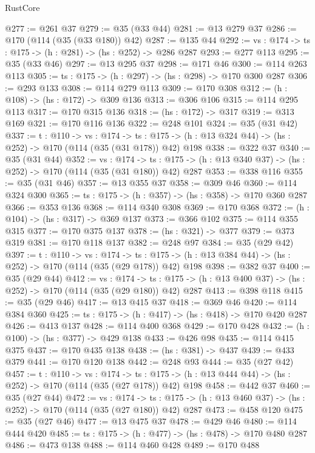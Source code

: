 \begin{lexlean}{RustCore}
\begin{coremodule}
@277 := @261 @37
@279 := @35 (@33 @44)
@281 := @13 @279 @37
@286 := @170 (@114 (@35 (@33 @180)) @42)
@287 := @135 @44
@292 := {vs : @174} -> {ts : @175} -> (h : @281) -> (hs : @252) -> @286 @287
@293 := @277 @113
@295 := @35 (@33 @46)
@297 := @13 @295 @37
@298 := @171 @46
@300 := @114 @263 @113
@305 := {ts : @175} -> (h : @297) -> (hs : @298) -> @170 @300 @287
@306 := @293 @133
@308 := @114 @279 @113
@309 := @170 @308
@312 := (h : @108) -> (hs : @172) -> @309 @136
@313 := @306 @106
@315 := @114 @295 @113
@317 := @170 @315 @136
@318 := (hs : @172) -> @317
@319 := @313 @169
@321 := @170 @116 @136
@322 := @248 @101
@324 := @35 (@31 @42)
@337 := {t : @110} ->
  {vs : @174} ->
  {ts : @175} -> (h : @13 @324 @44) -> (hs : @252) -> @170 (@114 (@35 (@31 @178)) @42) @198
@338 := @322 @37
@340 := @35 (@31 @44)
@352 := {vs : @174} ->
  {ts : @175} -> (h : @13 @340 @37) -> (hs : @252) -> @170 (@114 (@35 (@31 @180)) @42) @287
@353 := @338 @116
@355 := @35 (@31 @46)
@357 := @13 @355 @37
@358 := @309 @46
@360 := @114 @324 @300
@365 := {ts : @175} -> (h : @357) -> (hs : @358) -> @170 @360 @287
@366 := @353 @136
@368 := @114 @340 @308
@369 := @170 @368
@372 := (h : @104) -> (hs : @317) -> @369 @137
@373 := @366 @102
@375 := @114 @355 @315
@377 := @170 @375 @137
@378 := (hs : @321) -> @377
@379 := @373 @319
@381 := @170 @118 @137
@382 := @248 @97
@384 := @35 (@29 @42)
@397 := {t : @110} ->
  {vs : @174} ->
  {ts : @175} -> (h : @13 @384 @44) -> (hs : @252) -> @170 (@114 (@35 (@29 @178)) @42) @198
@398 := @382 @37
@400 := @35 (@29 @44)
@412 := {vs : @174} ->
  {ts : @175} -> (h : @13 @400 @37) -> (hs : @252) -> @170 (@114 (@35 (@29 @180)) @42) @287
@413 := @398 @118
@415 := @35 (@29 @46)
@417 := @13 @415 @37
@418 := @369 @46
@420 := @114 @384 @360
@425 := {ts : @175} -> (h : @417) -> (hs : @418) -> @170 @420 @287
@426 := @413 @137
@428 := @114 @400 @368
@429 := @170 @428
@432 := (h : @100) -> (hs : @377) -> @429 @138
@433 := @426 @98
@435 := @114 @415 @375
@437 := @170 @435 @138
@438 := (hs : @381) -> @437
@439 := @433 @379
@441 := @170 @120 @138
@442 := @248 @93
@444 := @35 (@27 @42)
@457 := {t : @110} ->
  {vs : @174} ->
  {ts : @175} -> (h : @13 @444 @44) -> (hs : @252) -> @170 (@114 (@35 (@27 @178)) @42) @198
@458 := @442 @37
@460 := @35 (@27 @44)
@472 := {vs : @174} ->
  {ts : @175} -> (h : @13 @460 @37) -> (hs : @252) -> @170 (@114 (@35 (@27 @180)) @42) @287
@473 := @458 @120
@475 := @35 (@27 @46)
@477 := @13 @475 @37
@478 := @429 @46
@480 := @114 @444 @420
@485 := {ts : @175} -> (h : @477) -> (hs : @478) -> @170 @480 @287
@486 := @473 @138
@488 := @114 @460 @428
@489 := @170 @488

\end{coremodule}
\end{lexlean}
